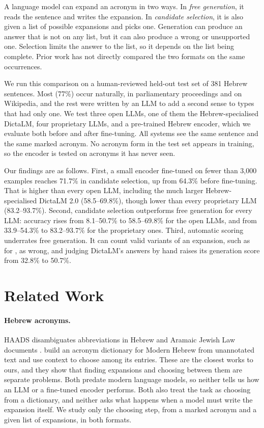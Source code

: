 \documentclass[11pt]{article}
\newcommand{\heb}[1]{\R{#1}}
\begin{document}
A language model can expand an acronym in two ways. In \emph{free generation}, it reads the sentence and writes the expansion. In \emph{candidate selection}, it is also given a list of possible expansions and picks one. Generation can produce an answer that is not on any list, but it can also produce a wrong or unsupported one. Selection limits the answer to the list, so it depends on the list being complete. Prior work has not directly compared the two formats on the same occurrences.

We run this comparison on a human-reviewed held-out test set of 381 Hebrew sentences. Most (77\%) occur naturally, in parliamentary proceedings and on Wikipedia, and the rest were written by an LLM to add a second sense to types that had only one. We test three open LLMs, one of them the Hebrew-specialised DictaLM, four proprietary LLMs, and a pre-trained Hebrew encoder, which we evaluate both before and after fine-tuning. All systems see the same sentence and the same marked acronym. No acronym form in the test set appears in training, so the encoder is tested on acronyms it has never seen.

Our findings are as follows. First, a small encoder fine-tuned on fewer than 3,000 examples reaches 71.7\% in candidate selection, up from 64.3\% before fine-tuning. That is higher than every open LLM, including the much larger Hebrew-specialised DictaLM 2.0 (58.5--69.8\%), though lower than every proprietary LLM (83.2--93.7\%). Second, candidate selection outperforms free generation for every LLM: accuracy rises from 8.1--50.7\% to 58.5--69.8\% for the open LLMs, and from 33.9--54.3\% to 83.2--93.7\% for the proprietary ones. Third, automatic scoring underrates free generation. It can count valid variants of an expansion, such as \heb{שקלים חדשים} for \heb{שקל חדש}, as wrong, and judging DictaLM's answers by hand raises its generation score from 32.8\% to 50.7\%.

\section{Related Work}
\label{sec:related-work}
\paragraph{Hebrew acronyms.}
HAADS disambiguates abbreviations in Hebrew and Aramaic Jewish Law documents \citep{hacohenkerner2010haads}. \citet{jacobs2020acronyms} build an acronym dictionary for Modern Hebrew from unannotated text and use context to choose among its entries. These are the closest works to ours, and they show that finding expansions and choosing between them are separate problems. Both predate modern language models, so neither tells us how an LLM or a fine-tuned encoder performs. Both also treat the task as choosing from a dictionary, and neither asks what happens when a model must write the expansion itself. We study only the choosing step, from a marked acronym and a given list of expansions, in both formats.
\end{document}
